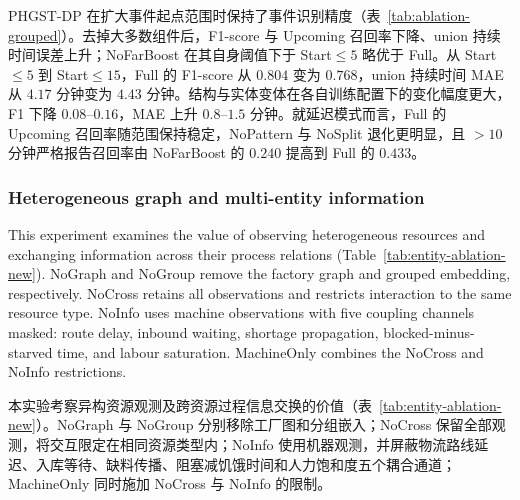 \documentclass[a4paper,fleqn]{cas-dc}
\newcommand{\zhpara}[1]{%
  \par\begingroup\small\color{black!72}\noindent #1\par\endgroup}
\begin{document}
\zhpara{PHGST-DP 在扩大事件起点范围时保持了事件识别精度（表~\ref{tab:ablation-grouped}）。去掉大多数组件后，F1-score 与 Upcoming 召回率下降、union 持续时间误差上升；NoFarBoost 在其自身阈值下于 Start$\leq5$ 略优于 Full。从 Start$\leq5$ 到 Start$\leq15$，Full 的 F1-score 从 $0.804$ 变为 $0.768$，union 持续时间 MAE 从 $4.17$ 分钟变为 $4.43$ 分钟。结构与实体变体在各自训练配置下的变化幅度更大，F1 下降 $0.08$--$0.16$，MAE 上升 $0.8$--$1.5$ 分钟。就延迟模式而言，Full 的 Upcoming 召回率随范围保持稳定，NoPattern 与 NoSplit 退化更明显，且 $>10$ 分钟严格报告召回率由 NoFarBoost 的 $0.240$ 提高到 Full 的 $0.433$。}

\subsubsection{Heterogeneous graph and multi-entity information}

This experiment examines the value of observing heterogeneous resources and exchanging information across their process relations (Table~\ref{tab:entity-ablation-new}). NoGraph and NoGroup remove the factory graph and grouped embedding, respectively. NoCross retains all observations and restricts interaction to the same resource type. NoInfo uses machine observations with five coupling channels masked: route delay, inbound waiting, shortage propagation, blocked-minus-starved time, and labour saturation. MachineOnly combines the NoCross and NoInfo restrictions.

\zhpara{本实验考察异构资源观测及跨资源过程信息交换的价值（表~\ref{tab:entity-ablation-new}）。NoGraph 与 NoGroup 分别移除工厂图和分组嵌入；NoCross 保留全部观测，将交互限定在相同资源类型内；NoInfo 使用机器观测，并屏蔽物流路线延迟、入库等待、缺料传播、阻塞减饥饿时间和人力饱和度五个耦合通道；MachineOnly 同时施加 NoCross 与 NoInfo 的限制。}
\end{document}
